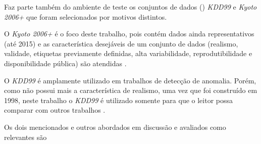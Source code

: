 Faz parte também do ambiente de teste os conjuntos de dados (\datasets)
\emph{KDD99}
e \emph{Kyoto 2006+}
que foram selecionados por motivos distintos.

O \dataset \emph{Kyoto 2006+} é o foco deste trabalho, pois contém dados ainda
representativos (até 2015) e as característica desejáveis de um conjunto de
dados (realismo, validade, etiquetas previamente definidas, alta variabilidade,
reprodutibilidade e disponibilidade pública) são atendidas
\cite{KyotoDataset,Song2011kyoto}.

O \dataset \emph{KDD99} é amplamente utilizado em trabalhos de detecção de
anomalia.
Porém, como não possui mais a característica de realismo, uma vez que foi
construído em 1998, neste trabalho o \dataset \emph{KDD99} é utilizado somente
para que o leitor possa comparar com outros trabalhos
\cite{Tavallaee2009Kdd,Protic2018KddKyoto}.

Os dois \datasets mencionados e outros abordados em discussão e avaliados como
relevantes são

% 
% 
% 

